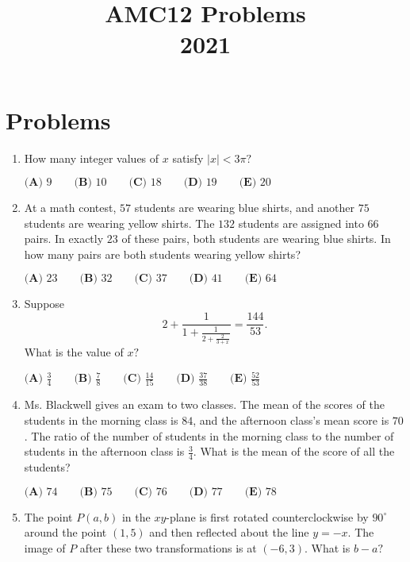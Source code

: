 \documentclass{article}
\title{AMC12 Problems \\ 2021}
\date{}
\begin{document}
\maketitle\thispagestyle{fancy}\newpage\section*{Problems}\begin{enumerate}[label=\arabic*., itemsep=0.5em]\item How many integer values of \(x\) satisfy \(|x|<3\pi?\)

\(\textbf{(A) }9 \qquad \textbf{(B) }10 \qquad \textbf{(C) }18 \qquad \textbf{(D) }19 \qquad \textbf{(E) }20\)\par \vspace{0.5em}\item At a math contest, \(57\) students are wearing blue shirts, and another \(75\) students are wearing yellow shirts. The \(132\) students are assigned into \(66\) pairs. In exactly \(23\) of these pairs, both students are wearing blue shirts. In how many pairs are both students wearing yellow shirts?

\(\textbf{(A) }23 \qquad \textbf{(B) }32 \qquad \textbf{(C) }37 \qquad \textbf{(D) }41 \qquad \textbf{(E) }64\)\par \vspace{0.5em}\item Suppose
\begin{equation*}
2+\frac{1}{1+\frac{1}{2+\frac{2}{3+x}}}=\frac{144}{53}.
\end{equation*}
What is the value of \(x?\)

\(\textbf{(A) }\frac34 \qquad \textbf{(B) }\frac78 \qquad \textbf{(C) }\frac{14}{15} \qquad \textbf{(D) }\frac{37}{38} \qquad \textbf{(E) }\frac{52}{53}\)\par \vspace{0.5em}\item Ms. Blackwell gives an exam to two classes. The mean of the scores of the students in the morning class is \(84\), and the afternoon class's mean score is \(70\). The ratio of the number of students in the morning class to the number of students in the afternoon class is \(\frac34\). What is the mean of the score of all the students?

\(\textbf{(A) }74 \qquad \textbf{(B) }75 \qquad \textbf{(C) }76 \qquad \textbf{(D) }77 \qquad \textbf{(E) }78\)\par \vspace{0.5em}\item The point \(P(a,b)\) in the \(xy\)-plane is first rotated counterclockwise by \(90^\circ\) around the point \((1,5)\) and then reflected about the line \(y=-x\). The image of \(P\) after these two transformations is at \((-6,3)\). What is \(b-a?\)


\end{enumerate}
\end{document}

